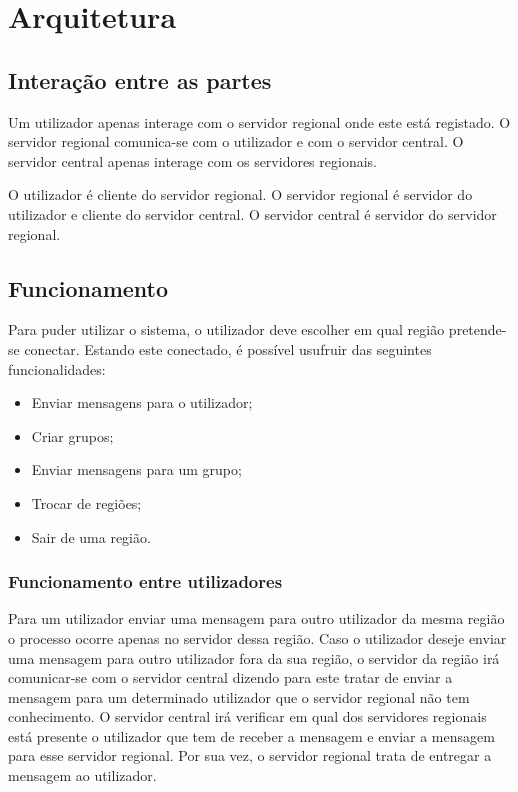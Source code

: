\chapter{Arquitetura}

\section{Interação entre as partes}
Um utilizador apenas interage com o servidor regional onde este está registado. O servidor regional comunica-se com o utilizador e com o servidor central. O servidor central apenas interage com os servidores regionais.

\begin{figure}[h]
\end{figure}

O utilizador é cliente do servidor regional. O servidor regional é servidor do utilizador e cliente do servidor central. O servidor central é servidor do servidor regional.

\section{Funcionamento}

Para puder utilizar o sistema, o utilizador deve escolher em qual região pretende-se conectar. Estando este conectado, é possível usufruir das seguintes funcionalidades:
\begin{itemize}
	\item Enviar mensagens para o utilizador;
	\item Criar grupos;
	\item Enviar mensagens para um grupo;
	\item Trocar de regiões;
	\item Sair de uma região.
\end{itemize}

\subsection{Funcionamento entre utilizadores}
Para um utilizador enviar uma mensagem para outro utilizador da mesma região o processo ocorre apenas no servidor dessa região. Caso o utilizador deseje enviar uma mensagem para outro utilizador fora da sua região, o servidor da região irá comunicar-se com o servidor central dizendo para este tratar de enviar a mensagem para um determinado utilizador que o servidor regional não tem conhecimento. O servidor central irá verificar em qual dos servidores regionais está presente o utilizador que tem de receber a mensagem e enviar a mensagem para esse servidor regional. Por sua vez, o servidor regional trata de entregar a mensagem ao utilizador.

